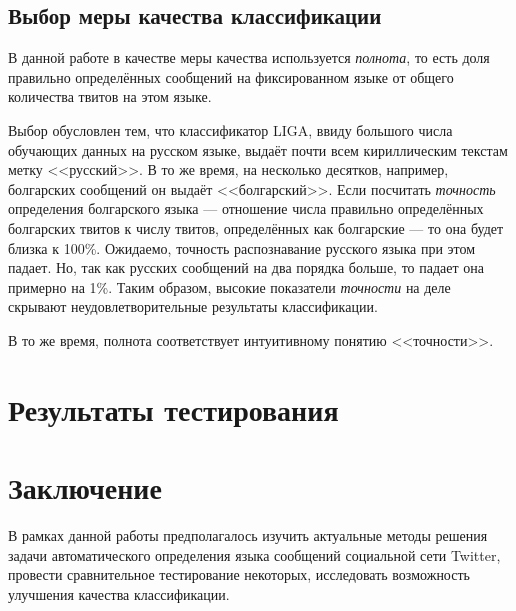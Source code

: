 \documentclass[a4paper, 14pt]{article}
\begin{document}
		\subsection{Выбор меры качества классификации}
		В данной работе в качестве меры качества используется \textit{полнота}, то есть доля правильно определённых сообщений на фиксированном языке
		от общего количества твитов на этом языке.
		
		Выбор обусловлен тем, что классификатор LIGA, ввиду большого числа обучающих данных на русском языке,
		выдаёт почти всем кириллическим текстам метку <<русский>>. В то же время, на несколько десятков, например, болгарских сообщений он выдаёт 
		<<болгарский>>. Если посчитать \textit{точность} определения болгарского языка --- отношение числа правильно определённых болгарских твитов 
		к числу твитов, определённых как болгарские --- то она будет близка к 100\%. Ожидаемо, точность распознавание русского языка при этом падает.
		Но, так как русских сообщений на два порядка больше, то падает она примерно на 1\%. Таким образом, высокие показатели \textit{точности} на деле
		скрывают неудовлетворительные результаты классификации.
		
		В то же время, полнота соответствует интуитивному понятию <<точности>>.
       
\section{Результаты тестирования}
	
	\begin{center}
	\end{center}		
	
\section{Заключение}
		В рамках данной работы предполагалось изучить актуальные методы решения задачи автоматического определения языка сообщений социальной сети Twitter, провести сравнительное тестирование некоторых, исследовать возможность улучшения качества классификации. 
		
\end{document}
